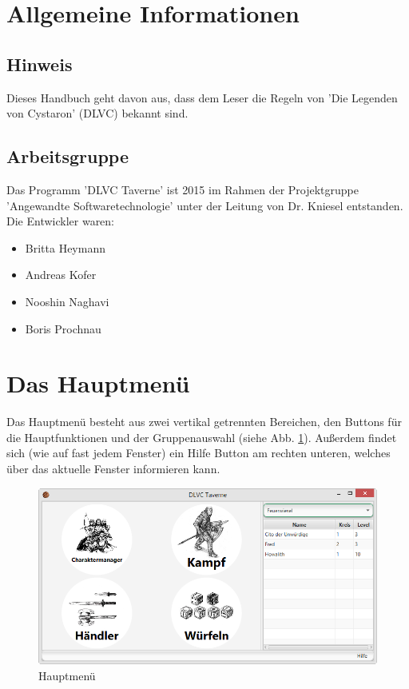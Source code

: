 \documentclass[11pt, a4paper, german]{article}
\begin{document}

\clearpage

\tableofcontents
\pagebreak

\section{Allgemeine Informationen}
\subsection{Hinweis}
Dieses Handbuch geht davon aus, dass dem Leser die Regeln von 'Die Legenden von Cystaron' (DLVC) bekannt sind. 
\subsection{Arbeitsgruppe}
Das Programm 'DLVC Taverne' ist 2015 im Rahmen der Projektgruppe 'Angewandte Softwaretechnologie' unter der Leitung von Dr. Kniesel entstanden. Die Entwickler waren:
\begin{itemize}
	\item[] Britta Heymann
	\item[] Andreas Kofer
	\item[] Nooshin Naghavi
	\item[] Boris Prochnau
\end{itemize}

\newpage
\section{Das Hauptmenü}
Das Hauptmenü besteht aus zwei vertikal getrennten Bereichen, den Buttons für die Hauptfunktionen und der Gruppenauswahl (siehe Abb. \ref{fig:Hauptmenue1}). Außerdem findet sich (wie auf fast jedem Fenster) ein Hilfe Button am rechten unteren, welches über das aktuelle Fenster informieren kann.\\
\begin{figure}
\centering
\includegraphics[width=1\linewidth]{Bilder/Hauptmenue1}
\caption{Hauptmenü}
\label{fig:Hauptmenue1}
\end{figure}
\end{document}
